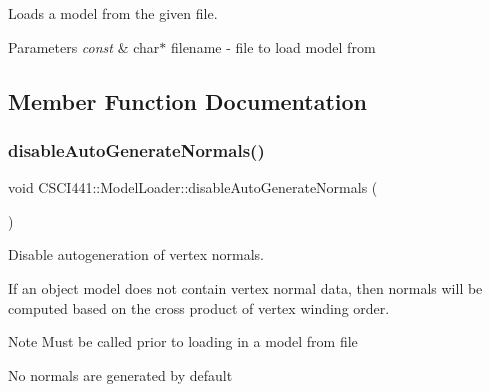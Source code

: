 Loads a model from the given file. 


\begin{DoxyParams}{Parameters}
{\em const} & char$\ast$ filename -\/ file to load model from \\
\hline
\end{DoxyParams}


\subsection{Member Function Documentation}
\mbox{\label{class_c_s_c_i441_1_1_model_loader_aaf1ec38a0f551569ccf1a47af2a561f3}} 
\subsubsection{\texorpdfstring{disable\+Auto\+Generate\+Normals()}{disableAutoGenerateNormals()}}
{\footnotesize\ttfamily void C\+S\+C\+I441\+::\+Model\+Loader\+::disable\+Auto\+Generate\+Normals (\begin{DoxyParamCaption}{ }\end{DoxyParamCaption})\hspace{0.3cm}{\ttfamily [static]}}



Disable autogeneration of vertex normals. 

If an object model does not contain vertex normal data, then normals will be computed based on the cross product of vertex winding order.

\begin{DoxyNote}{Note}
Must be called prior to loading in a model from file 

No normals are generated by default 
\end{DoxyNote}
\mbox{\label{class_c_s_c_i441_1_1_model_loader_a46734dcf7845e240a1ca9a31d6e5a468}} 
